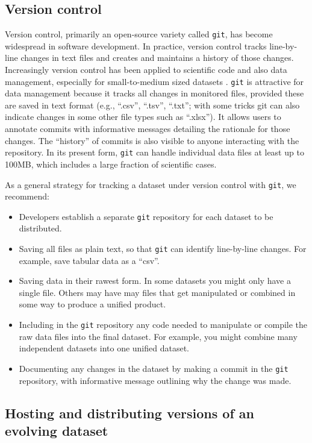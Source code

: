 \documentclass[a4paper,num-refs]{assets/oup-contemporary}
\begin{document}
\subsection{Version control}

Version control, primarily an open-source variety called \texttt{git}, has become widespread in software development. In practice, version control tracks line-by-line changes in text files and creates and maintains a history of those changes. Increasingly version control has been applied to scientific code and also data management, especially for small-to-medium sized datasets \cite{Ram-2013, Perkel-2016, Lowndes-2017}. \texttt{git} is attractive for data management because it tracks all changes in monitored files, provided these are saved in text format (e.g., ``.csv'', ``.tsv'', ``.txt''; with some tricks git can also indicate changes in some other file types such as ``.xlsx''). It  allows users to annotate commits with informative messages detailing the rationale for those changes.  The ``history'' of commits is also visible to anyone interacting with the repository. In its present form, \texttt{git} can handle individual data files at least up to 100MB, which includes a large fraction of scientific cases.

As a general strategy for tracking a dataset under version control with \texttt{git}, we recommend:
\begin{itemize}
  \item Developers establish a separate \texttt{git} repository for each dataset to be distributed.
  \item Saving all files as plain text, so that \texttt{git} can identify line-by-line changes. For example, save tabular data as a ``csv''.
  \item Saving data in their rawest form. In some datasets you might only have a single file. Others may have may files that get manipulated or combined in some way to produce a unified product.
  \item Including in the \texttt{git} repository any code needed to manipulate or compile the raw data files into the final dataset. For example, you might combine many independent datasets into one unified dataset.
  \item Documenting any changes in the dataset by making a commit in the \texttt{git} repository, with informative message outlining why the change was made.
\end{itemize}


\subsection{Hosting and distributing versions of an evolving dataset}
\end{document}
